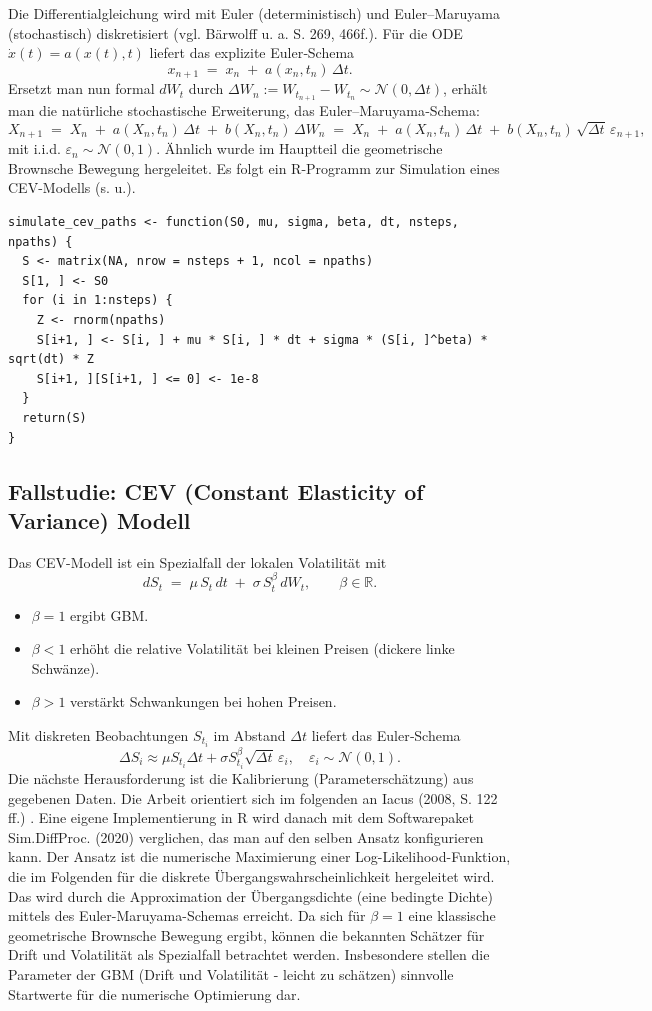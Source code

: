 Die Differentialgleichung wird mit Euler (deterministisch) und Euler–Maruyama (stochastisch) diskretisiert (vgl. Bärwolff \cite{Baerwolff2025} u. a. S. 269, 466f.).
Für die ODE $\dot x(t)=a(x(t),t)$ liefert das explizite Euler‑Schema
$$
x_{n+1} \;=\; x_n \;+\; a(x_n,t_n)\,\Delta t.
$$
Ersetzt man nun formal $dW_t$ durch $\Delta W_n:=W_{t_{n+1}}-W_{t_n}\sim \mathcal N(0,\Delta t)$, erhält man die natürliche stochastische Erweiterung, das Euler–Maruyama‑Schema:
$$
X_{n+1} \;=\; X_n \;+\; a(X_n,t_n)\,\Delta t \;+\; b(X_n,t_n)\,\Delta W_n
\;=\; X_n \;+\; a(X_n,t_n)\,\Delta t \;+\; b(X_n,t_n)\,\sqrt{\Delta t}\,\varepsilon_{n+1},
$$
mit i.i.d. $\varepsilon_{n}\sim\mathcal N(0,1)$. 
Ähnlich wurde im Hauptteil die geometrische Brownsche Bewegung hergeleitet.
Es folgt ein R-Programm zur Simulation eines CEV-Modells (s. u.).

\begin{lstlisting}
simulate_cev_paths <- function(S0, mu, sigma, beta, dt, nsteps, npaths) {
  S <- matrix(NA, nrow = nsteps + 1, ncol = npaths)
  S[1, ] <- S0
  for (i in 1:nsteps) {
    Z <- rnorm(npaths)
    S[i+1, ] <- S[i, ] + mu * S[i, ] * dt + sigma * (S[i, ]^beta) * sqrt(dt) * Z
    S[i+1, ][S[i+1, ] <= 0] <- 1e-8
  }
  return(S)
}
\end{lstlisting}

\subsection{Fallstudie: CEV (Constant Elasticity of Variance) Modell}
Das CEV-Modell ist ein Spezialfall der lokalen Volatilität mit
$$
dS_t \;=\; \mu\,S_t\,dt \;+\; \sigma\,S_t^{\beta}\,dW_t,\qquad \beta\in\mathbb R.
$$
\begin{itemize}
\item $\beta=1$ ergibt GBM. 
\item $\beta<1$ erhöht die relative Volatilität bei kleinen Preisen (dickere linke Schwänze).
\item $\beta>1$ verstärkt Schwankungen bei hohen Preisen.
\end{itemize}
Mit diskreten Beobachtungen $S_{t_i}$ im Abstand $\Delta t$ liefert das Euler‑Schema
$$
\Delta S_i \approx \mu S_{t_i}\Delta t + \sigma S_{t_i}^{\beta}\sqrt{\Delta t}\,\varepsilon_i,\quad \varepsilon_i\sim\mathcal N(0,1).
$$
Die nächste Herausforderung ist die Kalibrierung (Parameterschätzung) aus gegebenen Daten. Die Arbeit 
orientiert sich im folgenden an Iacus (2008, S. 122 ff.) \cite{iacus2008}. Eine eigene Implementierung in
R wird danach mit dem Softwarepaket Sim.DiffProc. \cite{rsde} (2020) verglichen, das man auf den selben Ansatz konfigurieren kann.
Der Ansatz ist die numerische Maximierung einer Log-Likelihood-Funktion, die im Folgenden für die diskrete Übergangswahrscheinlichkeit hergeleitet wird.
Das wird durch die Approximation der Übergangsdichte (eine bedingte Dichte) mittels des Euler-Maruyama-Schemas erreicht. Da sich für $\beta=1$ eine klassische geometrische Brownsche Bewegung ergibt, 
können die bekannten Schätzer für Drift und Volatilität als Spezialfall betrachtet werden. Insbesondere stellen die Parameter der GBM (Drift und Volatilität - leicht zu schätzen) 
sinnvolle Startwerte für die numerische Optimierung dar.


